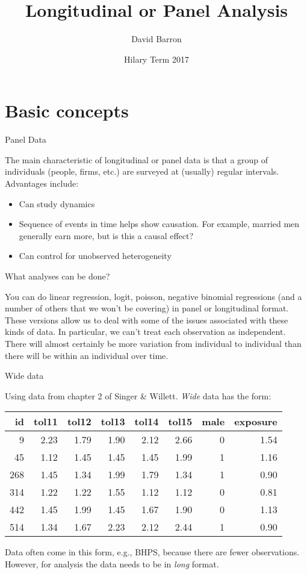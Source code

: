 \documentclass[10pt,ignorenonframetext,]{beamer}
\title{Longitudinal or Panel Analysis}
\author{David Barron}
\date{Hilary Term 2017}
\providecommand{\tightlist}{%
\setlength{\itemsep}{0pt}\setlength{\parskip}{0pt}}
\begin{document}
\frame{\titlepage}

\section{Basic concepts}\label{basic-concepts}

\begin{frame}{Panel Data}

The main characteristic of longitudinal or panel data is that a group of
individuals (people, firms, etc.) are surveyed at (usually) regular
intervals. Advantages include:

\begin{itemize}
\tightlist
\item
  Can study dynamics
\item
  Sequence of events in time helps show causation. For example, married
  men generally earn more, but is this a causal effect?
\item
  Can control for unobserved heterogeneity
\end{itemize}

\end{frame}

\begin{frame}{What analyses can be done?}

You can do linear regression, logit, poisson, negative binomial
regressions (and a number of others that we won't be covering) in panel
or longitudinal format. These versions allow us to deal with some of the
issues associated with these kinds of data. In particular, we can't
treat each observation as independent. There will almost certainly be
more variation from individual to individual than there will be within
an individual over time.

\end{frame}

\begin{frame}{Wide data}

Using data from chapter 2 of Singer \& Willett. \emph{Wide} data has the
form:

\small

\begin{longtable}[]{@{}rrrrrrrr@{}}
\toprule
id & tol11 & tol12 & tol13 & tol14 & tol15 & male &
exposure\tabularnewline
\midrule
\endhead
9 & 2.23 & 1.79 & 1.90 & 2.12 & 2.66 & 0 & 1.54\tabularnewline
45 & 1.12 & 1.45 & 1.45 & 1.45 & 1.99 & 1 & 1.16\tabularnewline
268 & 1.45 & 1.34 & 1.99 & 1.79 & 1.34 & 1 & 0.90\tabularnewline
314 & 1.22 & 1.22 & 1.55 & 1.12 & 1.12 & 0 & 0.81\tabularnewline
442 & 1.45 & 1.99 & 1.45 & 1.67 & 1.90 & 0 & 1.13\tabularnewline
514 & 1.34 & 1.67 & 2.23 & 2.12 & 2.44 & 1 & 0.90\tabularnewline
\bottomrule
\end{longtable}

Data often come in this form, e.g., BHPS, because there are fewer
observations. However, for analysis the data needs to be in \emph{long}
format.

\end{frame}
\end{document}
